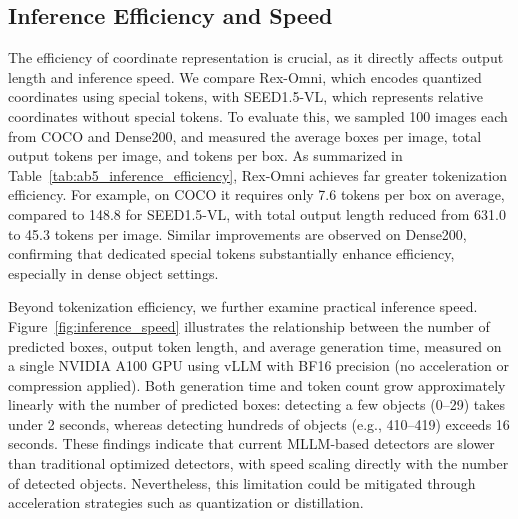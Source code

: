 \subsection{Inference Efficiency and Speed}
The efficiency of coordinate representation is crucial, as it directly affects output length and inference speed. We compare Rex-Omni, which encodes quantized coordinates using special tokens, with SEED1.5-VL, which represents relative coordinates without special tokens. To evaluate this, we sampled 100 images each from COCO and Dense200, and measured the average boxes per image, total output tokens per image, and tokens per box. As summarized in Table~\ref{tab:ab5_inference_efficiency}, Rex-Omni achieves far greater tokenization efficiency. For example, on COCO it requires only 7.6 tokens per box on average, compared to 148.8 for SEED1.5-VL, with total output length reduced from 631.0 to 45.3 tokens per image. Similar improvements are observed on Dense200, confirming that dedicated special tokens substantially enhance efficiency, especially in dense object settings.

Beyond tokenization efficiency, we further examine practical inference speed. Figure~\ref{fig:inference_speed} illustrates the relationship between the number of predicted boxes, output token length, and average generation time, measured on a single NVIDIA A100 GPU using vLLM with BF16 precision (no acceleration or compression applied). Both generation time and token count grow approximately linearly with the number of predicted boxes: detecting a few objects (0–29) takes under 2 seconds, whereas detecting hundreds of objects (e.g., 410–419) exceeds 16 seconds. These findings indicate that current MLLM-based detectors are slower than traditional optimized detectors, with speed scaling directly with the number of detected objects. Nevertheless, this limitation could be mitigated through acceleration strategies such as quantization or distillation.